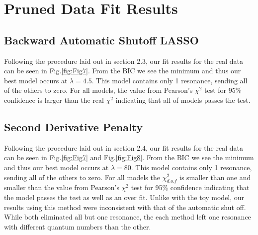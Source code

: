\documentclass[aps, prd, twocolumn, showpacs, superscriptaddress,
preprintnumbers, nofootinbib]{revtex4-1}
\begin{document}
\section{Pruned Data Fit Results} \label{sec:Pruned Data Fit Results}


\subsection{Backward Automatic Shutoff LASSO}

Following the procedure laid out in section 2.3, our fit results for the real data can be seen in Fig.\ref{fig:Fig7}. From the BIC we see the minimum and thus our best model occurs at $\lambda=4.5$. This model contains only 1 resonance, sending all of the others to zero. For all models, the value from Pearson's $\chi^2$ test for 95\% confidence is larger than the real $\chi^2$ indicating that all of models passes the test.

\subsection{Second Derivative Penalty}

Following the procedure laid out in section 2.4, our fit results for the real data can be seen in Fig.\ref{fig:Fig7} and Fig.\ref{fig:Fig8}. From the BIC we see the minimum and thus our best model occurs at $\lambda=80$. This model contains only 1 resonance, sending all of the others to zero. For all models the $\chi^2_{d.o.f}$ is smaller than one and smaller than the value from Pearson's $\chi^2$ test for 95\% confidence indicating that the model passes the test as well as an over fit.
Unlike with the toy model, our results using this method were inconsistent with that of the automatic shut off. While both eliminated all but one resonance, the each method left one resonance with different quantum numbers than the other.
\end{document}
